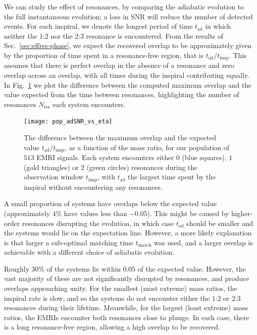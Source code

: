 \documentclass[aps,prd,amsfonts,amssymb,amsmath,nofootinbib,showpacs,superscriptaddress,twocolumn,floatfix]{revtex4-1}
\newcommand{\figref}[1]{Fig.~\ref{fig:#1}}
\newcommand{\secref}[1]{Sec.~\ref{sec:#1}}
\newcommand{\sub}[1]{\ensuremath{_\mathrm{#1}}}
\begin{document}
We can study the effect of resonances, by comparing the adiabatic evolution to the full instantaneous evolution; a loss in SNR will reduce the number of detected events. For each inspiral, we denote the longest period of time $t\sub{ad}$ in which neither the $1$:$2$ nor the $2$:$3$ resonance is encountered. From the results of \secref{effres-phase}, we expect the recovered overlap to be approximately given by the proportion of time spent in a resonance-free region, that is $t\sub{ad} / t\sub{insp}$. This assumes that there is perfect overlap in the absence of a resonance and zero overlap across an overlap, with all times during the inspiral contributing equally. 
In \figref{pop-adSNR-vs-eta} we plot the difference between the computed maximum overlap and the value expected from the time between resonances, highlighting the number of resonances $N\sub{res}$ each system encounters.

\begin{figure}
\centering
\texttt{[image: pop\_adSNR\_vs\_eta]}
\caption{\label{fig:pop-adSNR-vs-eta}The difference between the maximum overlap and the expected value $t\sub{ad} / t\sub{insp}$, as a function of the mass ratio, for our population of $513$ EMRI signals. Each system encounters either $0$ (blue squares), $1$ (gold triangles) or $2$ (green circles) resonances during the observation window $t\sub{insp}$, with $t\sub{ad}$ the largest time spent by the inspiral without encountering any resonances.}
\end{figure}

A small proportion of systems have overlaps below the expected value (approximately $4\%$ have values less than $-0.05$). This might be caused by higher-order resonances disrupting the evolution, in which case $t\sub{ad}$ should be smaller and the systems would lie on the expectation line. However, a more likely explanation is that larger a sub-optimal matching time $t\sub{match}$ was used, and a larger overlap is achievable with a different choice of adiabatic evolution.

Roughly $30\%$ of the systems lie within $0.05$ of the expected value. However, the vast majority of these are not significantly disrupted by resonances, and produce overlaps approaching unity. For the smallest (most extreme) mass ratios, the inspiral rate is slow, and so the systems do not encounter either the $1$:$2$ or $2$:$3$ resonances during their lifetime. Meanwhile, for the largest (least extreme) mass ratios, the EMRIs encounter both resonances close to plunge. In each case, there is a long resonance-free region, allowing a high overlap to be recovered.
\end{document}
